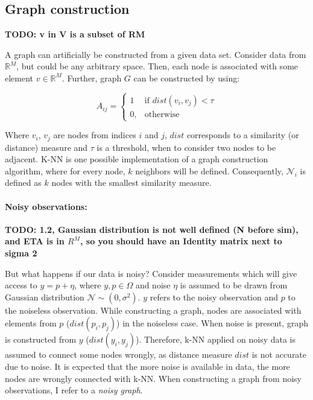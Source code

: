 \subsection{Graph construction}
\textbf{TODO: v in V is a subset of RM}

\label{sec:graphConstruction}
A graph can artificially be constructed from a given data set.
Consider data from $\mathbb{R}^M$, but could be any arbitrary space.
Then, each node is associated with some element $v \in \mathbb{R}^M$. 
Further, graph $G$ can be constructed by using:

\begin{equation}
    \label{eq:graphConstruction}
    A_{ij} =    
    \begin{cases}
        1  & \text{if } dist(v_i, v_j) < \tau\\
        0, & \text{otherwise}
    \end{cases}
\end{equation}

Where $v_i$, $v_j$ are nodes from indices $i$ and $j$, $dist$ corresponds to a similarity (or distance) measure and $\tau$ is a threshold, 
when to consider two nodes to be adjacent.
K-NN is one possible implementation of a graph construction algorithm, 
where for every node, $k$ neighbors will be defined.
Consequently, $\mathcal{N}_i$ is defined as $k$ nodes with the smallest similarity measure.

\paragraph{Noisy observations:}
\textbf{TODO:
1.2, Gaussian distribution is not well defined (N before sim), 
and ETA is in $R^M$, so you should have an Identity matrix next to sigma 2}

But what happens if our data is noisy?
Consider measurements which will give access to $y = p + \eta$, where $y,p \in \Omega$ and noise $\eta$ is assumed to be drawn from Gaussian distribution $\mathcal{N} \sim (0,\sigma^2)$.
$y$ refers to the noisy observation and $p$ to the noiseless observation.
While constructing a graph, nodes are associated with elements from $p$ ($dist(p_i, p_j)$) in the noiseless case.
When noise is present, graph is constructed from $y$ ($dist(y_i, y_j)$).
Therefore, k-NN applied on noisy data is assumed to connect some nodes wrongly, as distance measure $dist$
is not accurate due to noise. It is expected that the more noise is available in data, the more nodes are wrongly connected with k-NN.
When constructing a graph from noisy observations, I refer to a \textit{noisy graph}.

